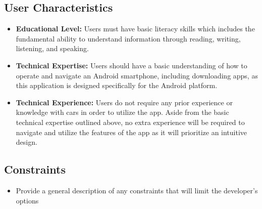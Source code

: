 \documentclass[]{article}
\begin{document}
\subsection{User Characteristics}
\label{sub:user_characteristics}

\begin{itemize}
	\item \textbf{Educational Level:} Users must have basic literacy skills which includes the fundamental ability to understand information through reading, writing, listening, and speaking.
	\item \textbf{Technical Expertise:} Users should have a basic understanding of how to operate and navigate an Android smartphone, including downloading apps, as this application is designed specifically for the Android platform.
	\item \textbf{Technical Experience:} Users do not require any prior experience or knowledge with cars in order to utilize the app. Aside from the basic technical expertise outlined above, no extra experience will be required to navigate and utilize the features of the app as it will prioritize an intuitive design.
\end{itemize}

\subsection{Constraints}
\label{sub:constraints}
\begin{itemize}
	\item Provide a general description of any constraints that will limit the developer's options
\end{itemize}
\end{document}
